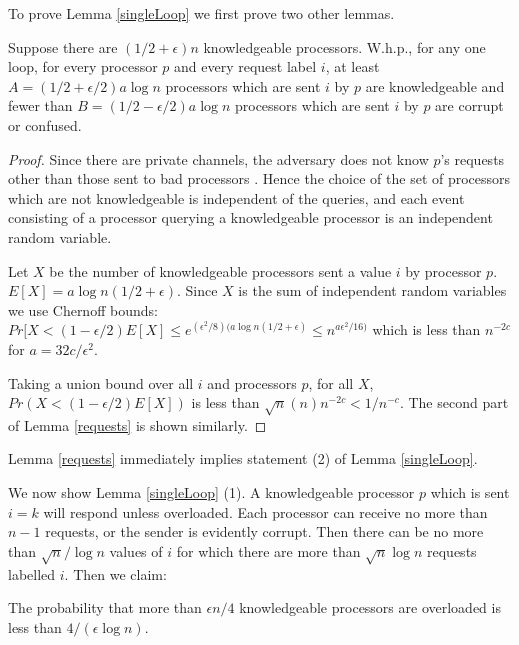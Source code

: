 \documentclass{sig-alternate}
\begin{document}
To prove Lemma \ref{singleLoop} we first prove two other lemmas.
 
 \begin{lemma} \label{requests} Suppose there are $(1/2+ \epsilon) n $ knowledgeable processors.  W.h.p., for any one loop, for every processor $p$ and every request label $i$,
 at least $A=(1/2+ \epsilon/2) a \log n$ processors which are sent $i$ by $p$ are knowledgeable and fewer than $B=(1/2 - \epsilon/2)a \log n$ processors which are sent  $i$ by $p$ are corrupt or confused.
 
 \end{lemma}
 \begin{proof}
 Since there are private channels, the adversary does not know $p$'s requests other than those sent to bad processors .  Hence the choice of the set  of processors which are not knowledgeable is independent of the queries,  and each  event  consisting of a processor querying a knowledgeable processor is an independent random variable. 
 
 Let $X$ be the number of knowledgeable processors sent a value $i$ by processor $p$. $E[X]= a\log n (1/2 + \epsilon)$.
 Since $X$ is the sum of independent random variables we use
 Chernoff bounds:  $Pr[X < (1- \epsilon/2) E[X] \leq e^{(\epsilon^2/8)( a\log n (1/2 + \epsilon)}\leq n^{a\epsilon^2/16)}$ which is less than 
 $n^{-2c}$ for $a= 32c/\epsilon^2$.
 
Taking a union bound over all $i$ and  processors $p$,  for all $X$,  $Pr(X<   (1- \epsilon/2) E[X] )$
is less than $\sqrt{n}(n)n^{-2c} < 1/n^{-c}$. The second part of Lemma \ref{requests} is shown similarly.
\end{proof}

Lemma \ref{requests} immediately implies statement (2) of Lemma \ref{singleLoop}.


We now show Lemma \ref{singleLoop} (1). A knowledgeable processor $p$ which is sent $i=k$ will respond unless overloaded. Each processor can receive no more than $n-1$ requests, or the sender is evidently corrupt.
Then there can be no more than  $\sqrt{n}/\log n$ values of  $i$ for which there are more than  $\sqrt{n} \log  n$ requests labelled $i$. Then we claim:

 
 \begin{lemma}\label{overload}
The probability that more than $\epsilon n/4 $ knowledgeable processors are overloaded is less than $4/(\epsilon \log n)$.
\end{lemma}
\end{document}
